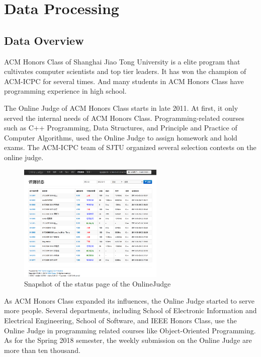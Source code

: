 
\chapter{Data Processing}


\section{Data Overview}

    ACM Honors Class\cite{acmclass} of Shanghai Jiao Tong University is a elite program
    that cultivates computer scientists and top tier leaders.
    It has won the champion of ACM-ICPC for several times.
    And many students in ACM Honors Class have programming experience in high school.

    The Online Judge\cite{acmoj} of ACM Honors Class starts in late 2011.
    At first, it only served the internal needs of ACM Honors Class.
    Programming-related courses such as C++ Programming, Data Structures,
    and Principle and Practice of Computer Algorithms,
    used the Online Judge to assign homework and hold exams.
    The ACM-ICPC team of SJTU organized several selection contests on the online judge.

    \begin{figure}[htp]
        \centering
        \includegraphics[width=0.62\textwidth]{img/acmoj.png}
        \caption{Snapshot of the status page of the OnlineJudge}
        \label{fig:acmoj}
    \end{figure}

    As ACM Honors Class expanded its influences, the Online Judge started to serve more people.
    Several departments, including School of Electronic Information and Electrical Engineering,
    School of Software, and IEEE Honors Class, use the Online Judge in programming related courses
    like Object-Oriented Programming.
    As for the Spring 2018 semester, the weekly submission on the Online Judge are more than ten thousand.

